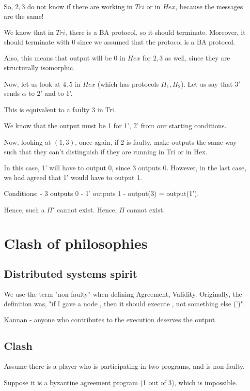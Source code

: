 \documentclass[11pt]{article}
\begin{document}
So, $2, 3$ do not know if there are working in $Tri$ or in $Hex$, because
the messages are the same!

We know that in $Tri$, there is a BA protocol, so it should terminate.
Moreover, it should terminate with $0$ since we assumed that the protocol
is a BA protocol.

Also, this means that output will be $0$ in $Hex$ for $2, 3$ as well, since
they are structurally isomorphic.


Now, let us look at $4, 5$ in $Hex$ (which has protocols $\Pi_1, \Pi_2$).
Let us say that $3'$sends $\alpha$ to $2'$ and \beta to 1'.

This is equivalent to a faulty 3 in Tri.

We know that the output must be 1 for 1', 2' from our starting conditions.


Now, looking at $(1, 3)$, once again, if 2 is faulty, make outputs the
same way such that they can't distinguish if they are running in Tri or in Hex.

In this case, 1' will have to output 0, since 3 outputs 0. However,
in the last case, we had agreed that 1' would have to output 1.

Conditions:
- 3 outputs 0
- 1' outputs 1
- output(3) = output(1').

Hence, such a $\Pi'$ cannot exist. Hence, $\Pi$ cannot exist.


\section{Clash of philosophies}

\subsection{Distributed systems spirit}
We use the term "non faulty" when defining Agreement, Validity. Originally,
the definition was, "if I gave a node \Pi, then it should execute \Pi,
not something else (\Pi')".

Kannan - anyone who contributes to the execution deserves the output

\subsection{Clash}

Assume there is a player who is participating in two programs, and
is non-faulty.

Suppose it is a byzantine agreement program (1 out of 3), which is impossible.
\end{document}
